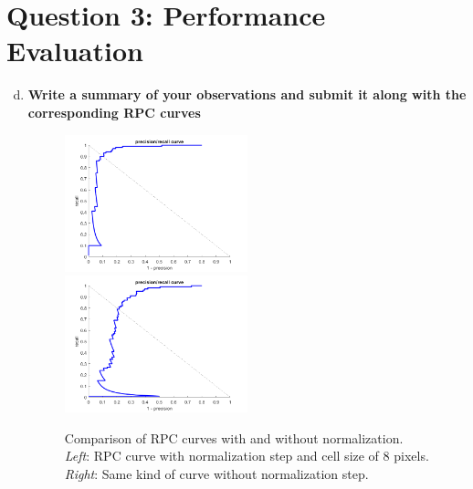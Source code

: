 \documentclass[12pt]{article}
\begin{document}
\newpage
\section*{Question 3: Performance Evaluation}
\begin{enumerate}[a)]
	\setcounter{enumi}{3}
	

	\item
        \textbf{Write a summary of your observations and submit it along with the corresponding RPC curves}\\
        
        \begin{figure}[h]			
        	\includegraphics[width=0.5\textwidth]{rpc_norm8}
        	\includegraphics[width=0.5\textwidth]{rpc_not_norm8}
        	\caption{Comparison of RPC curves with and without normalization. \textit{Left}: RPC curve with normalization step and cell size of 8 pixels. \textit{Right}: Same kind of curve without normalization step.}
        \end{figure}
        

\end{enumerate}
\end{document}
